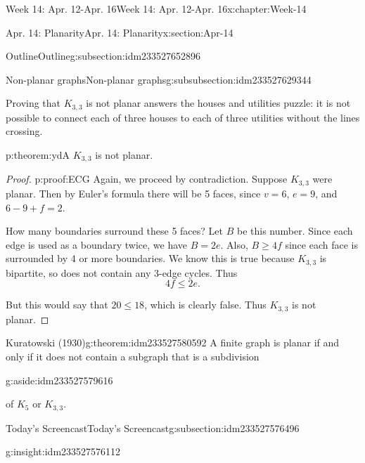 \documentclass[oneside,10pt,]{book}
\numberwithin{equation}{section}
\renewcommand{\le}{\leqslant}
\renewcommand{\ge}{\geqslant}
\begin{document}
\begin{chapterptx}{Week 14: Apr. 12-Apr. 16}{}{Week 14: Apr. 12-Apr. 16}{}{}{x:chapter:Week-14}
\begin{sectionptx}{Apr. 14: Planarity}{}{Apr. 14: Planarity}{}{}{x:section:Apr-14}
\begin{subsectionptx}{Outline}{}{Outline}{}{}{g:subsection:idm233527652896}
\begin{subsubsectionptx}{Non-planar graphs}{}{Non-planar graphs}{}{}{g:subsubsection:idm233527629344}
\begin{sidebyside}{1}{0.4}{0.4}{0}
\begin{sbspanel}{0.2}
{\begin{tikzpicture}[yscale=1.2]
        \end{tikzpicture}
}%
\end{sbspanel}%
\end{sidebyside}%
\par
Proving that \(K_{3,3}\) is not planar answers the houses and utilities puzzle: it is not possible to connect each of three houses to each of three utilities without the lines crossing.%
\begin{theorem}{}{}{p:theorem:ydA}%
%
%
\(K_{3,3}\) is not planar.%
\end{theorem}
\begin{proof}{}{p:proof:ECG}
Again, we proceed by contradiction. Suppose \(K_{3,3}\) were planar. Then by Euler's formula there will be 5 faces, since \(v = 6\), \(e = 9\), and \(6 - 9 + f = 2\).%
\par
How many boundaries surround these 5 faces? Let \(B\) be this number. Since each edge is used as a boundary twice, we have \(B = 2e\). Also, \(B \ge 4f\) since each face is surrounded by 4 or more boundaries. We know this is true because \(K_{3,3}\) is bipartite, so does not contain any 3-edge cycles. Thus%
\begin{equation*}
4f \le 2e\text{.}
\end{equation*}
%
\par
But this would say that \(20 \le 18\), which is clearly false. Thus \(K_{3,3}\) is not planar.%
\end{proof}
\begin{theorem}{}{Kuratowski (1930)}{g:theorem:idm233527580592}%
A finite graph is planar if and only if it does not contain a subgraph that is a subdivision\begin{aside}{}{g:aside:idm233527579616}%
\end{aside}
 of \(K_5\) or \(K_{3,3}\).%
\end{theorem}
\end{subsubsectionptx}
\end{subsectionptx}
%
%
\typeout{************************************************}
\typeout{************************************************}
%
\begin{subsectionptx}{Today's Screencast}{}{Today's Screencast}{}{}{g:subsection:idm233527576496}
\begin{insight}{}{g:insight:idm233527576112}%
\end{insight}
\end{subsectionptx}

\end{sectionptx}
\end{chapterptx}
\end{document}
